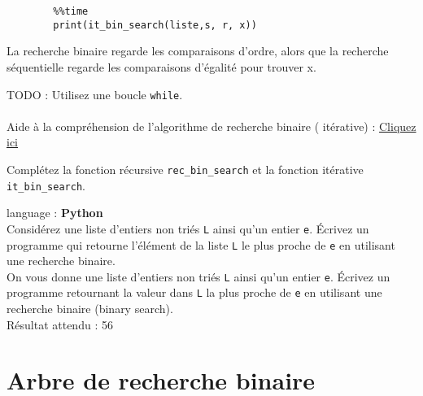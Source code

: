 \begin{Exercice}[10-15 minutes]
\begin{lstlisting}
        %%time
        print(it_bin_search(liste,s, r, x))
    \end{lstlisting}

    La recherche binaire regarde les comparaisons d'ordre, alors que la recherche séquentielle regarde les comparaisons d'égalité pour trouver x.\\

    \begin{conseil}
        TODO : Utilisez une boucle \lstinline{while}.\\\\
        Aide à la compréhension de l'algorithme de recherche binaire ( itérative) : \href{https://runestone.academy/runestone/books/published/pythonds/SortSearch/TheBinarySearch.html}{Cliquez ici}
    \end{conseil}
   
    \begin{solution}
        Complétez la fonction récursive \lstinline{rec_bin_search} et la fonction itérative \lstinline{it_bin_search}. 
    \end{solution}


\end{Exercice}


\begin{Exercice}[10 minutes] language : \textbf{Python}\\

Considérez une liste d’entiers non triés \lstinline{L} ainsi qu’un entier \lstinline{e}. Écrivez un programme qui retourne l'élément de la liste \lstinline{L} le plus proche de \lstinline{e} en utilisant une recherche binaire.\\

On vous donne une liste d’entiers non triés \lstinline{L} ainsi qu’un entier \lstinline{e}. Écrivez un programme retournant la valeur dans \lstinline{L} la plus proche de \lstinline{e} en utilisant une recherche binaire (binary search).\\

Résultat attendu : 56\\

\end{Exercice}



\newpage
\section{Arbre de recherche binaire}



